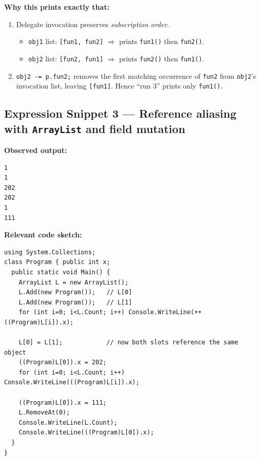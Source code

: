 \textbf{Why this prints exactly that:}
\begin{enumerate}
  \item Delegate invocation preserves \emph{subscription order}.
        \begin{itemize}
          \item \verb|obj1| list: \verb|[fun1, fun2]| $\Rightarrow$ prints \verb|fun1()| then \verb|fun2()|.
          \item \verb|obj2| list: \verb|[fun2, fun1]| $\Rightarrow$ prints \verb|fun2()| then \verb|fun1()|.
        \end{itemize}
  \item \verb|obj2 -= p.fun2;| removes the first matching occurrence of \verb|fun2| from \verb|obj2|'s invocation list, leaving \verb|[fun1]|. Hence ``run 3'' prints only \verb|fun1()|.
\end{enumerate}

\subsection*{Expression Snippet 3 — Reference aliasing with \texttt{ArrayList} and field mutation}
\textbf{Observed output:}
\begin{verbatim}
1
1
202
202
1
111
\end{verbatim}

\textbf{Relevant code sketch:}
\begin{verbatim}
using System.Collections;
class Program { public int x; 
  public static void Main() {
    ArrayList L = new ArrayList();
    L.Add(new Program());   // L[0]
    L.Add(new Program());   // L[1]
    for (int i=0; i<L.Count; i++) Console.WriteLine(++((Program)L[i]).x);

    L[0] = L[1];            // now both slots reference the same object
    ((Program)L[0]).x = 202;
    for (int i=0; i<L.Count; i++) Console.WriteLine(((Program)L[i]).x);

    ((Program)L[0]).x = 111;
    L.RemoveAt(0);
    Console.WriteLine(L.Count);
    Console.WriteLine(((Program)L[0]).x);
  }
}
\end{verbatim}


